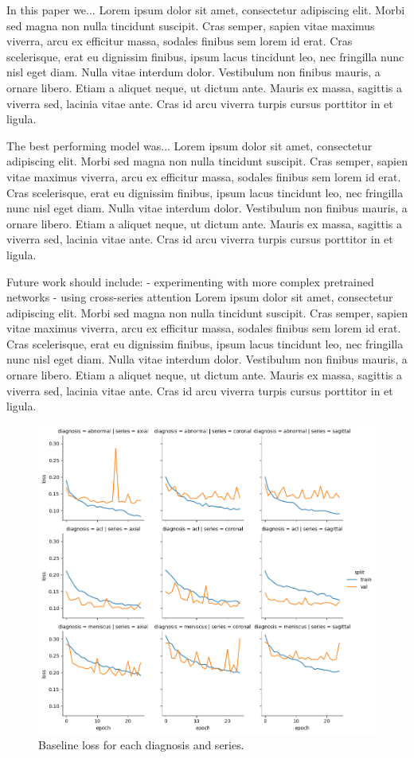 \documentclass[10pt,twocolumn,letterpaper]{article}
\begin{document}
In this paper we...
Lorem ipsum dolor sit amet, consectetur adipiscing elit. Morbi sed magna non nulla tincidunt suscipit. Cras semper, sapien vitae maximus viverra, arcu ex efficitur massa, sodales finibus sem lorem id erat. Cras scelerisque, erat eu dignissim finibus, ipsum lacus tincidunt leo, nec fringilla nunc nisl eget diam. Nulla vitae interdum dolor. Vestibulum non finibus mauris, a ornare libero. Etiam a aliquet neque, ut dictum ante. Mauris ex massa, sagittis a viverra sed, lacinia vitae ante. Cras id arcu viverra turpis cursus porttitor in et ligula.

The best performing model was...
Lorem ipsum dolor sit amet, consectetur adipiscing elit. Morbi sed magna non nulla tincidunt suscipit. Cras semper, sapien vitae maximus viverra, arcu ex efficitur massa, sodales finibus sem lorem id erat. Cras scelerisque, erat eu dignissim finibus, ipsum lacus tincidunt leo, nec fringilla nunc nisl eget diam. Nulla vitae interdum dolor. Vestibulum non finibus mauris, a ornare libero. Etiam a aliquet neque, ut dictum ante. Mauris ex massa, sagittis a viverra sed, lacinia vitae ante. Cras id arcu viverra turpis cursus porttitor in et ligula.

Future work should include:
- experimenting with more complex pretrained networks
- using cross-series attention
Lorem ipsum dolor sit amet, consectetur adipiscing elit. Morbi sed magna non nulla tincidunt suscipit. Cras semper, sapien vitae maximus viverra, arcu ex efficitur massa, sodales finibus sem lorem id erat. Cras scelerisque, erat eu dignissim finibus, ipsum lacus tincidunt leo, nec fringilla nunc nisl eget diam. Nulla vitae interdum dolor. Vestibulum non finibus mauris, a ornare libero. Etiam a aliquet neque, ut dictum ante. Mauris ex massa, sagittis a viverra sed, lacinia vitae ante. Cras id arcu viverra turpis cursus porttitor in et ligula.

\begin{figure}
\begin{center}
\includegraphics[width=0.5\linewidth]{../images/MRNet-aug_loss.png}
\end{center}
   \caption{Baseline loss for each diagnosis and series.}
\label{fig:mrnet_loss}
\end{figure}
\end{document}
